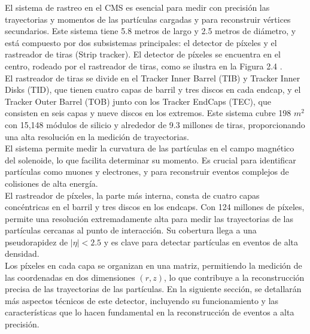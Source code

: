 El sistema de rastreo en el CMS es esencial para medir con precisión las trayectorias y momentos de las partículas cargadas y para reconstruir vértices secundarios. Este sistema tiene 5.8 metros de largo y 2.5 metros de diámetro, y está compuesto por dos subsistemas principales: el detector de píxeles y el rastreador de tiras (Strip tracker). El detector de píxeles se encuentra en el centro, rodeado por el rastreador de tiras, como se ilustra en la Figura 2.4 \cite{pas_18}.\\

El rastreador de tiras se divide en el Tracker Inner Barrel (TIB) y Tracker Inner Disks (TID), que tienen cuatro capas de barril y tres discos en cada endcap, y el Tracker Outer Barrel (TOB) junto con los Tracker EndCaps (TEC), que consisten en seis capas y nueve discos en los extremos. Este sistema cubre 198 $m^{2}$ con 15,148 módulos de silicio y alrededor de 9.3 millones de tiras, proporcionando una alta resolución en la medición de trayectorias.\\

El sistema permite medir la curvatura de las partículas en el campo magnético del solenoide, lo que facilita determinar su momento. Es crucial para identificar partículas como muones y electrones, y para reconstruir eventos complejos de colisiones de alta energía.\\

El rastreador de píxeles, la parte más interna, consta de cuatro capas concéntricas en el barril y tres discos en los endcaps. Con 124 millones de píxeles, permite una resolución extremadamente alta para medir las trayectorias de las partículas cercanas al punto de interacción. Su cobertura llega a una pseudorapidez de \( | \eta | < 2.5 \) y es clave para detectar partículas en eventos de alta densidad.\\

Los píxeles en cada capa se organizan en una matriz, permitiendo la medición de las coordenadas en dos dimensiones $(r, z)$, lo que contribuye a la reconstrucción precisa de las trayectorias de las partículas. En la siguiente sección, se detallarán más aspectos técnicos de este detector, incluyendo su funcionamiento y las características que lo hacen fundamental en la reconstrucción de eventos a alta precisión.\\



